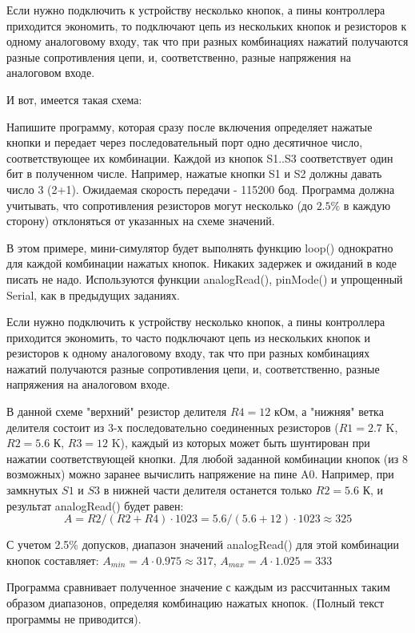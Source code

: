 
Если нужно подключить к устройству несколько кнопок, а пины контроллера приходится экономить, то подключают цепь из нескольких кнопок и резисторов к одному аналоговому входу, так что при разных комбинациях нажатий получаются разные сопротивления цепи, и, соответственно, разные напряжения на  аналоговом входе.  

И вот, имеется такая схема:


Напишите программу, которая сразу после включения определяет нажатые кнопки и передает через последовательный порт одно десятичное число, 
соответствующее их комбинации.  Каждой из кнопок S1..S3 соответствует один бит в полученном числе.  Например, нажатые кнопки S1 и S2 должны 
давать число 3  (2+1).     Ожидаемая скорость передачи - 115200 бод.  Программа должна учитывать,  что сопротивления резисторов могут 
несколько (до $2.5\%$ в каждую сторону) отклоняться от  указанных на схеме значений.

В этом примере, мини-симулятор будет выполнять функцию loop() однократно для каждой комбинации нажатых кнопок.  Никаких  задержек 
и ожиданий в коде писать не надо.  Используются функции analogRead(), pinMode() и упрощенный Serial, как в предыдущих заданиях.

\solutionSection

Если нужно подключить к устройству несколько кнопок, а пины контроллера приходится экономить, то часто подключают цепь из нескольких кнопок и резисторов к одному аналоговому входу, так что при разных комбинациях нажатий получаются разные сопротивления цепи, и, соответственно, разные напряжения на  аналоговом входе.

В данной схеме "верхний" резистор делителя $R4=12$ кОм, а "нижняя" ветка делителя состоит из 3-х последовательно соединенных резисторов ($R1=2.7$ K, $R2=5.6$ К, $R3=12$ K), каждый из которых может быть шунтирован при нажатии соответствующей кнопки.  Для любой заданной комбинации кнопок (из 8 возможных) можно заранее вычислить напряжение на пине A0. Например, при замкнутых $S1$ и $S3$ в нижней части делителя останется только $R2=5.6$ К, и результат analogRead() будет равен:
$$A= R2 / (R2 + R4) \cdot 1023 = 5.6 / (5.6 + 12 ) \cdot 1023 \approx 325$$

С учетом 2.5\% допусков, диапазон значений analogRead() для этой комбинации кнопок составляет:  $A_{min} = A \cdot 0.975 \approx 317$,  $A_{max} = A \cdot 1.025 = 333$

Программа сравнивает полученное значение с каждым из рассчитанных таким образом диапазонов, определяя комбинацию нажатых кнопок.  (Полный текст программы не приводится).